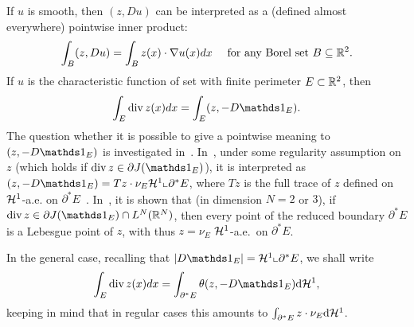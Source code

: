 \begin{rem}
If $u$ is smooth, then $(z,Du)$ can be interpreted as a (defined almost everywhere) pointwise inner product:
\begin{align*}
  \int_B (z,Du) = \int_B z(x) \cdot \nabla u(x)dx \quad \mbox{ for any Borel set } B \subseteq \mathbb{R}^2.
\end{align*}
If $u$ is the characteristic function of set with finite perimeter $E\subset \mathbb{R}^2$, then
\begin{align*}
 \int_E \divx z(x)dx = \int_E (z,-D\bun{E}).
\end{align*}
The question whether it is possible to give a pointwise meaning to $(z,-D\bun{E})$ is investigated in~\cite{bredies2012,ChaGolNov12a}.
In~\cite{bredies2012}, under some regularity assumption on $z$ (which holds if $\divx z \in \partial J(\bun{E})$), it is interpreted as $(z,-D\bun{E})=Tz\cdot \nu_E \Hh^1\llcorner \partial^*E$, where $Tz$ is the full trace of $z$ defined on $\mathcal{H}^1$-a.e. on $\partial^*E$~\cite{bredies2012}. In~\cite{ChaGolNov12a}, it is shown that (in dimension $N=2$ or $3$), if $\divx z \in \partial J(\bun{E})\cap L^N(\RR^N)$, then every point of the reduced boundary $\partial^*E$ is a Lebesgue point of $z$, with thus $z=\nu_E$ $\mathcal{H}^1$-a.e.~on $\partial^*E$.

In the general case, recalling that $\abs{D\bun{E}}= \Hh^1\llcorner \partial^*E$, we shall write
\begin{equation}
  \int_E \divx z(x)dx = \int_{\partial^*E} \theta(z,-D\bun{E})\d\Hh^{1},
\end{equation}
keeping in mind that in regular cases this amounts to $\int_{\partial^*E} z\cdot \nu_E\mathrm{d}\mathcal{H}^{1}$.
\end{rem}


